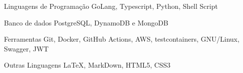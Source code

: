 
\begin{cvskills}
  \cvskill
  {Linguagens de Programação}
  {GoLang, Typescript, Python, Shell Script}

  \cvskill
  {Banco de dados}
  {PostgreSQL, DynamoDB e MongoDB}

  \cvskill
  {Ferramentas}
  {Git, Docker, GitHub Actions, AWS, testcontainers, GNU/Linux, Swagger, JWT}


  \cvskill
  {Outras Linguagens}
  {LaTeX, MarkDown, HTML5, CSS3}
\end{cvskills}
